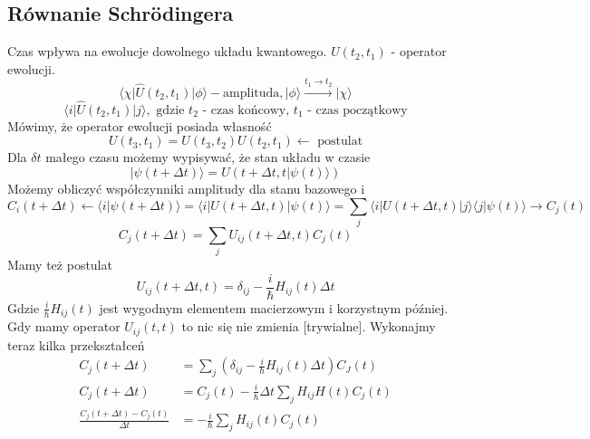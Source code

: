 \subsection{Równanie Schrödingera}
Czas wpływa na ewolucje dowolnego układu kwantowego. $U(t_2, t_1)$ - operator ewolucji.
\begin{equation*}
	\langle \chi \vert \hat{U}(t_2, t_1)\vert \phi \rangle - \text{amplituda}, \vert \phi \rangle \xrightarrow{t_1 \rightarrow t_2} \vert \chi \rangle
\end{equation*}
\begin{equation*}
	\langle i \vert \hat{U}(t_2, t_1)\vert j \rangle, \text{ gdzie $t_2$ - czas końcowy, $t_1$ - czas początkowy}
\end{equation*}
Mówimy, że operator ewolucji posiada własność
\begin{equation*}
	U(t_3, t_1) = U(t_3,t_2)U(t_2,t_1) \leftarrow \text{ postulat}
\end{equation*}
Dla $\delta t$ małego czasu możemy wypisywać, że stan układu w czasie
\begin{equation*}
	\vert \psi (t + \Delta t) \rangle = U(t+\Delta t, t\vert \psi(t) \rangle )
\end{equation*}
Możemy obliczyć współczynniki amplitudy dla stanu bazowego i
\begin{equation*}
	C_i(t+\Delta t) \leftarrow \langle i \vert \psi(t + \Delta t) \rangle = \langle i \vert U(t + \Delta t, t) \vert \psi(t)\rangle = \sum_j \langle i \vert U(t + \Delta t, t) \vert j \rangle \langle j \vert \psi(t) \rangle \rightarrow C_j(t)
\end{equation*}
\begin{equation*}
	C_j(t+\Delta t) = \sum_j U_{ij}(t + \Delta t, t) C_j(t)
\end{equation*}
Mamy też postulat
\begin{equation*}
	U_{ij}(t + \Delta t, t) = \delta_{ij} - \frac{i}{\hbar}H_{ij}(t)\Delta t
\end{equation*}
Gdzie $\frac{i}{\hbar}H_{ij}(t)$ jest wygodnym elementem macierzowym i korzystnym później. Gdy mamy operator $U_{ij}(t, t)$ to nic się nie zmienia [trywialne]. Wykonajmy teraz kilka przekształceń
\begin{equation*}
	\begin{split}
		C_j(t + \Delta t) &= \sum_j (\delta_{ij} - \frac{i}{\hbar}H_{ij}(t)\Delta t)C_J(t)\\
		C_j(t + \Delta t) &= C_j(t) - \frac{i}{\hbar}\Delta t \sum_j H_{ij} H(t) C_j(t) \\
		\frac{C_j(t + \Delta t) - C_j(t)}{\Delta t} &= - \frac{i}{\hbar} \sum_j H_{ij}(t) C_j(t)
	\end{split}
\end{equation*}
